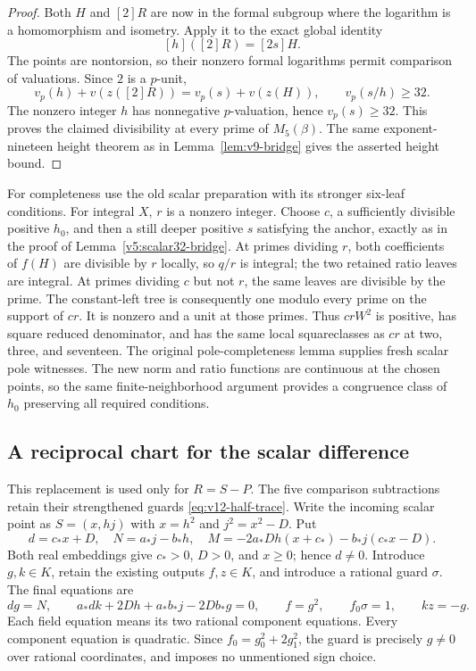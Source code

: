 \begin{proof}
Both $H$ and $[2]R$ are now in the formal subgroup where the logarithm
is a homomorphism and isometry.  Apply it to the exact global identity
\[
 [h]([2]R)=[2s]H.
\]
The points are nontorsion, so their nonzero formal logarithms permit
comparison of valuations.  Since $2$ is a $p$-unit,
\[
 v_p(h)+v(z([2]R))=v_p(s)+v(z(H)),
 \qquad v_p(s/h)\ge32.
\]
The nonzero integer $h$ has nonnegative $p$-valuation, hence
$v_p(s)\ge32$.  This proves the claimed divisibility at every prime
of $M_5(\beta)$.  The same exponent-nineteen height theorem as in
Lemma~\ref{lem:v9-bridge} gives the asserted height bound.
\end{proof}

For completeness use the old scalar preparation with its stronger
six-leaf conditions.  For integral $X$, $r$ is a nonzero integer.
Choose $c$, a sufficiently divisible positive $h_0$, and then a still
deeper positive $s$ satisfying the anchor, exactly as in the proof of
Lemma~\ref{v5:scalar32-bridge}.  At primes dividing $r$, both
coefficients of $f(H)$ are divisible by $r$ locally, so $q/r$ is
integral; the two retained ratio leaves are integral.  At primes
dividing $c$ but not $r$, the same leaves are divisible by the prime.
The constant-left tree is consequently one modulo every prime on
the support of $cr$.  It is nonzero and a unit at those primes.
Thus $crW^2$ is positive, has square reduced denominator, and has the
same local squareclasses as $cr$ at two, three, and seventeen.
The original pole-completeness lemma supplies fresh scalar pole
witnesses.  The new norm and ratio functions are continuous at the
chosen points, so the same finite-neighborhood argument provides a
congruence class of $h_0$ preserving all required conditions.

\subsection{A reciprocal chart for the scalar difference}
\label{subsec:v12-reciprocal}

This replacement is used only for $R=S-P$.  The five comparison
subtractions retain their strengthened guards
\eqref{eq:v12-half-trace}.  Write the incoming scalar point as
$S=(x,hj)$ with $x=h^2$ and $j^2=x^2-D$.  Put
\[
 d=c_*x+D,\quad N=a_*j-b_*h,\quad
 M=-2a_*Dh(x+c_*)-b_*j(c_*x-D).
\]
Both real embeddings give $c_*>0$, $D>0$, and $x\ge0$; hence $d\ne0$.
Introduce $g,k\in K$, retain the existing outputs $f,z\in K$, and
introduce a rational guard $\sigma$.  The final equations are
\begin{equation}\label{eq:v12-reciprocal}
 dg=N,\qquad
 a_*dk+2Dh+a_*b_*j-2Db_*g=0,\qquad
 f=g^2,\qquad f_0\sigma=1,\qquad kz=-g.
\end{equation}
Each field equation means its two rational component equations.
Every component equation is quadratic.  Since
$f_0=g_0^2+2g_1^2$, the guard is precisely $g\ne0$ over rational
coordinates, and imposes no unmentioned sign choice.


